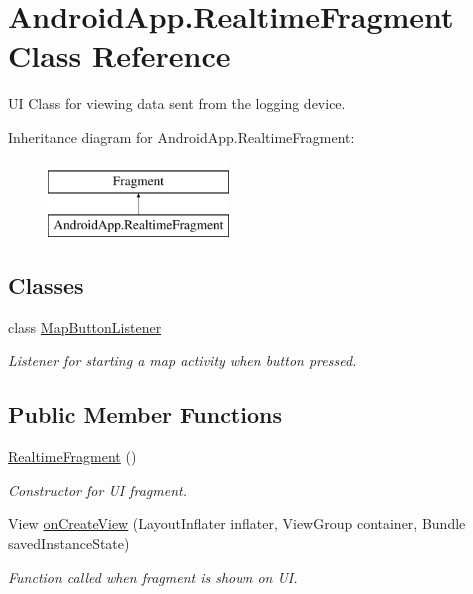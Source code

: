 \hypertarget{class_android_app_1_1_realtime_fragment}{}\section{Android\+App.\+Realtime\+Fragment Class Reference}
\label{class_android_app_1_1_realtime_fragment}


UI Class for viewing data sent from the logging device.  


Inheritance diagram for Android\+App.\+Realtime\+Fragment\+:\begin{figure}[H]
\begin{center}
\leavevmode
\includegraphics[height=2.000000cm]{class_android_app_1_1_realtime_fragment}
\end{center}
\end{figure}
\subsection*{Classes}
\begin{DoxyCompactItemize}
\item 
class \hyperlink{class_android_app_1_1_realtime_fragment_1_1_map_button_listener}{Map\+Button\+Listener}
\begin{DoxyCompactList}\small\item\em Listener for starting a map activity when button pressed. \end{DoxyCompactList}\end{DoxyCompactItemize}
\subsection*{Public Member Functions}
\begin{DoxyCompactItemize}
\item 
\hyperlink{class_android_app_1_1_realtime_fragment_a834ef524bedd8948892a6915945c071c}{Realtime\+Fragment} ()
\begin{DoxyCompactList}\small\item\em Constructor for UI fragment. \end{DoxyCompactList}\item 
View \hyperlink{class_android_app_1_1_realtime_fragment_a9efde75b84b4566f528b5cd53c908917}{on\+Create\+View} (Layout\+Inflater inflater, View\+Group container, Bundle saved\+Instance\+State)
\begin{DoxyCompactList}\small\item\em Function called when fragment is shown on UI. \end{DoxyCompactList}\end{DoxyCompactItemize}
